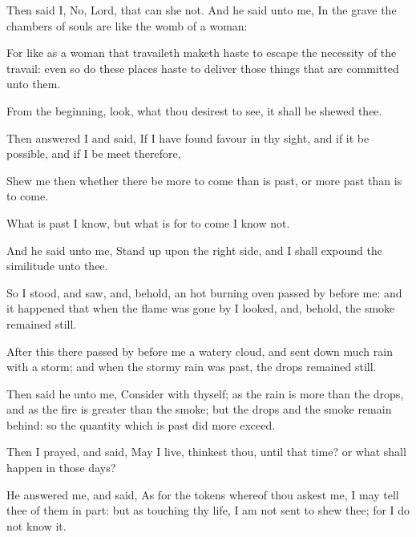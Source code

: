 {\par }{\PP {}Then said I, No, Lord, that can she not. And he said unto me, In the grave the chambers of souls are like the womb of a woman:
\par }{\PP {}For like as a woman that travaileth maketh haste to escape the necessity of the travail: even so do these places haste to deliver those things that are committed unto them.
\par }{\PP {}From the beginning, look, what thou desirest to see, it shall be shewed thee.
\par }{\PP {}Then answered I and said, If I have found favour in thy sight, and if it be possible, and if I be meet therefore,
\par }{\PP {}Shew me then whether there be more to come than is past, or more past than is to come.
\par }{\PP {}What is past I know, but what is for to come I know not.
\par }{\PP {}And he said unto me, Stand up upon the right side, and I shall expound the similitude unto thee.
\par }{\PP {}So I stood, and saw, and, behold, an hot burning oven passed by before me: and it happened that when the flame was gone by I looked, and, behold, the smoke remained still.
\par }{\PP {}After this there passed by before me a watery cloud, and sent down much rain with a storm; and when the stormy rain was past, the drops remained still.
\par }{\PP {}Then said he unto me, Consider with thyself; as the rain is more than the drops, and as the fire is greater than the smoke; but the drops and the smoke remain behind: so the quantity which is past did more exceed.
\par }{\PP {}Then I prayed, and said, May I live, thinkest thou, until that time? or what shall happen in those days?
\par }{\PP {}He answered me, and said, As for the tokens whereof thou askest me, I may tell thee of them in part: but as touching thy life, I am not sent to shew thee; for I do not know it.

}

